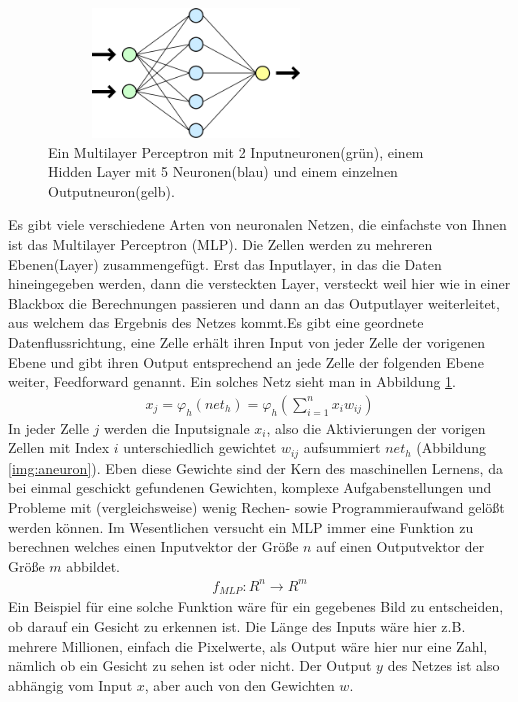 \begin{figure}
	\centering
	\includegraphics[width=0.7\textwidth, height=130px]{pics/MLP.png}	
	\caption{Ein Multilayer Perceptron mit 2 Inputneuronen(grün), einem Hidden Layer mit 5 Neuronen(blau) und einem einzelnen Outputneuron(gelb).   \cite{bib:mlp}}
	\label{img:mlp}
\end{figure}
Es gibt viele verschiedene Arten von neuronalen Netzen, die einfachste von Ihnen ist das Multilayer Perceptron (MLP). Die Zellen werden zu mehreren Ebenen(Layer) zusammengefügt. Erst das Inputlayer, in das die Daten hineingegeben werden, dann die versteckten Layer, versteckt weil hier wie in einer Blackbox die Berechnungen passieren und dann an das Outputlayer weiterleitet, aus welchem das Ergebnis des Netzes kommt.Es gibt eine geordnete Datenflussrichtung, eine Zelle erhält ihren Input von jeder Zelle der vorigenen Ebene und gibt ihren Output entsprechend an jede Zelle der folgenden Ebene weiter, Feedforward genannt. Ein solches Netz sieht man in Abbildung \ref{img:mlp}.  
\begin{gather}
x_{j} = \varphi_{h}(net_{h}) = \varphi_{h}(\sum_{i=1}^{n} x_{i}w_{ij}) 
\label{eq:act}
\end{gather}
In jeder Zelle \(j\) werden die Inputsignale \(x_{i}\), also die Aktivierungen der vorigen Zellen mit Index \(i\) unterschiedlich gewichtet \(w_{ij}\) aufsummiert \(net_{h}\) (Abbildung \ref{img:aneuron}).  Eben diese Gewichte sind der Kern des maschinellen Lernens, da bei einmal geschickt gefundenen Gewichten, komplexe Aufgabenstellungen und Probleme mit (vergleichsweise) wenig Rechen- sowie Programmieraufwand gelößt werden können. Im Wesentlichen versucht ein MLP immer eine Funktion zu berechnen welches einen Inputvektor der Größe \(n\) auf einen Outputvektor der Größe \(m\) abbildet.
\begin{gather*}
f_{MLP}: R^n \to R^m 
\end{gather*}
Ein Beispiel für eine solche Funktion wäre für ein gegebenes Bild zu entscheiden, ob darauf ein Gesicht zu erkennen ist. Die Länge des Inputs wäre hier z.B. mehrere Millionen, einfach die Pixelwerte, als Output wäre hier nur eine Zahl, nämlich ob ein Gesicht zu sehen ist oder nicht. Der Output \(y\) des Netzes ist also abhängig vom Input \(x\), aber auch von den Gewichten \(w\).
